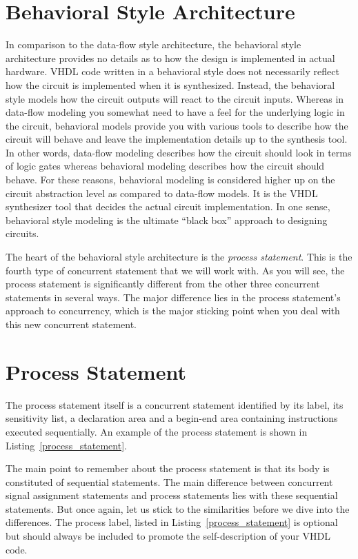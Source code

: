 \section{Behavioral Style Architecture}
In comparison to the data-flow style architecture, the behavioral style architecture provides no details as to how the design is implemented in actual hardware. VHDL code written in a behavioral style does not necessarily reflect how the circuit is implemented when it is synthesized. Instead, the behavioral style models how the circuit outputs will react to the circuit inputs. Whereas in data-flow modeling you somewhat need to have a feel for the underlying logic in the circuit, behavioral models provide you with various tools to describe how the circuit will behave and leave the implementation details up to the synthesis tool. In other words, data-flow modeling describes how the circuit should look in terms of logic gates whereas behavioral modeling describes how the circuit should behave. For these reasons, behavioral modeling is considered higher up on the circuit abstraction level as compared to data-flow models. It is the VHDL synthesizer tool that decides the actual circuit implementation. In one sense, behavioral style modeling is the ultimate ``black box'' approach to designing circuits.

The heart of the behavioral style architecture is the \textit{process statement}. This is the fourth type of concurrent statement that we will work with. As you will see, the process statement is significantly different from the other three concurrent statements in several ways. The major difference lies in the process statement's approach to concurrency, which is the major sticking point when you deal with this new concurrent statement.

\section{Process Statement}
The process statement itself is a concurrent statement identified by its label, its sensitivity list, a declaration area and a begin-end area containing instructions executed sequentially. An example of the process statement is shown in Listing~\ref{process_statement}. 

The main point to remember about the process statement is that its body is constituted of sequential statements. The main difference between concurrent signal assignment statements and process statements lies with these sequential statements. But once again, let us stick to the similarities before we dive into the differences. The process label, listed in Listing~\ref{process_statement} is optional but should always be included to promote the self-description of your VHDL code.

